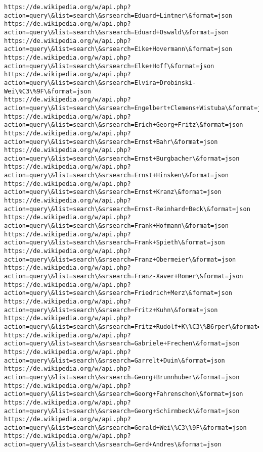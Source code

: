 \documentclass[11pt]{article}
\begin{document}
\begin{Verbatim}[commandchars=\\\{\}]
https://de.wikipedia.org/w/api.php?action=query\&list=search\&srsearch=Eduard+Lintner\&format=json
https://de.wikipedia.org/w/api.php?action=query\&list=search\&srsearch=Eduard+Oswald\&format=json
https://de.wikipedia.org/w/api.php?action=query\&list=search\&srsearch=Eike+Hovermann\&format=json
https://de.wikipedia.org/w/api.php?action=query\&list=search\&srsearch=Elke+Hoff\&format=json
https://de.wikipedia.org/w/api.php?action=query\&list=search\&srsearch=Elvira+Drobinski-Wei\%C3\%9F\&format=json
https://de.wikipedia.org/w/api.php?action=query\&list=search\&srsearch=Engelbert+Clemens+Wistuba\&format=json
https://de.wikipedia.org/w/api.php?action=query\&list=search\&srsearch=Erich+Georg+Fritz\&format=json
https://de.wikipedia.org/w/api.php?action=query\&list=search\&srsearch=Ernst+Bahr\&format=json
https://de.wikipedia.org/w/api.php?action=query\&list=search\&srsearch=Ernst+Burgbacher\&format=json
https://de.wikipedia.org/w/api.php?action=query\&list=search\&srsearch=Ernst+Hinsken\&format=json
https://de.wikipedia.org/w/api.php?action=query\&list=search\&srsearch=Ernst+Kranz\&format=json
https://de.wikipedia.org/w/api.php?action=query\&list=search\&srsearch=Ernst-Reinhard+Beck\&format=json
https://de.wikipedia.org/w/api.php?action=query\&list=search\&srsearch=Frank+Hofmann\&format=json
https://de.wikipedia.org/w/api.php?action=query\&list=search\&srsearch=Frank+Spieth\&format=json
https://de.wikipedia.org/w/api.php?action=query\&list=search\&srsearch=Franz+Obermeier\&format=json
https://de.wikipedia.org/w/api.php?action=query\&list=search\&srsearch=Franz-Xaver+Romer\&format=json
https://de.wikipedia.org/w/api.php?action=query\&list=search\&srsearch=Friedrich+Merz\&format=json
https://de.wikipedia.org/w/api.php?action=query\&list=search\&srsearch=Fritz+Kuhn\&format=json
https://de.wikipedia.org/w/api.php?action=query\&list=search\&srsearch=Fritz+Rudolf+K\%C3\%B6rper\&format=json
https://de.wikipedia.org/w/api.php?action=query\&list=search\&srsearch=Gabriele+Frechen\&format=json
https://de.wikipedia.org/w/api.php?action=query\&list=search\&srsearch=Garrelt+Duin\&format=json
https://de.wikipedia.org/w/api.php?action=query\&list=search\&srsearch=Georg+Brunnhuber\&format=json
https://de.wikipedia.org/w/api.php?action=query\&list=search\&srsearch=Georg+Fahrenschon\&format=json
https://de.wikipedia.org/w/api.php?action=query\&list=search\&srsearch=Georg+Schirmbeck\&format=json
https://de.wikipedia.org/w/api.php?action=query\&list=search\&srsearch=Gerald+Wei\%C3\%9F\&format=json
https://de.wikipedia.org/w/api.php?action=query\&list=search\&srsearch=Gerd+Andres\&format=json

\end{Verbatim}
\end{document}
